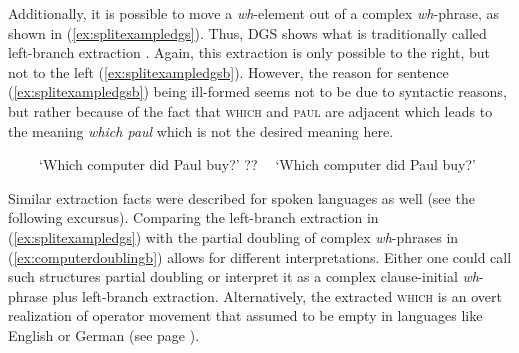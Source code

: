 \noindent Additionally, it is possible to move a \textit{wh}-element out of a complex \textit{wh}-phrase, as shown in (\ref{ex:splitexampledgs}). Thus, DGS shows what is traditionally called left-branch extraction \citep{bovskovic2005left, bovskovic2005locality}. Again, this extraction is only possible to the right, but not to the left (\ref{ex:splitexampledgsb}). However, the reason for sentence (\ref{ex:splitexampledgsb}) being ill-formed seems not to be due to syntactic reasons, but rather because of the fact that \textsc{which} and \textsc{paul} are adjacent which leads to the meaning \textit{which paul} which is not the desired meaning here.%


\begin{exe}
\ex\label{blablablahunderttausend}\begin{xlist}
\ex \textcolor{white}{??}
%
\glt \textcolor{white}{??}`Which computer did Paul buy?' \label{ex:splitexampledgs}
\ex ??
%
\glt \textcolor{white}{??}`Which computer did Paul buy?' \label{ex:splitexampledgsb}
\end{xlist}
\end{exe} 

\noindent Similar extraction facts were described for spoken languages as well (see the following excursus).\label{leftbranchextractiona} Comparing the left-branch extraction in (\ref{ex:splitexampledgs}) with the partial doubling of complex \textit{wh}-phrases in (\ref{ex:computerdoublingb}) allows for different interpretations. Either one could call such structures partial doubling or interpret it as a complex clause-initial \textit{wh}-phrase plus left-branch extraction. Alternatively, the extracted \textsc{which} is an overt realization of operator movement that \citet{van2010complex} assumed to be empty in languages like English or German (see page \pageref{emptyoperator}). 

